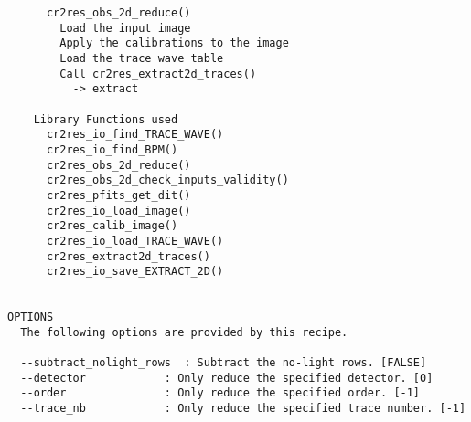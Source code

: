 \begin{verbatim}
      cr2res_obs_2d_reduce()                                              
        Load the input image                                              
        Apply the calibrations to the image                               
        Load the trace wave table                                         
        Call cr2res_extract2d_traces()                                    
          -> extract                                                      
                                                                          
    Library Functions used                                                
      cr2res_io_find_TRACE_WAVE()                                         
      cr2res_io_find_BPM()                                                
      cr2res_obs_2d_reduce()                                              
      cr2res_obs_2d_check_inputs_validity()                               
      cr2res_pfits_get_dit()                                              
      cr2res_io_load_image()                                              
      cr2res_calib_image()                                                
      cr2res_io_load_TRACE_WAVE()                                         
      cr2res_extract2d_traces()                                           
      cr2res_io_save_EXTRACT_2D()                                         
  

OPTIONS
  The following options are provided by this recipe.

  --subtract_nolight_rows  : Subtract the no-light rows. [FALSE]
  --detector            : Only reduce the specified detector. [0]
  --order               : Only reduce the specified order. [-1]
  --trace_nb            : Only reduce the specified trace number. [-1]

\end{verbatim}
